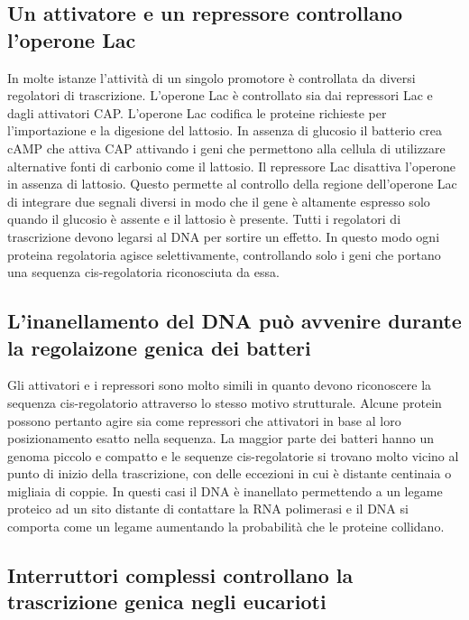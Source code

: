 \subsection{Un attivatore e un repressore controllano l'operone Lac}
In molte istanze l'attivit\`a di un singolo promotore \`e controllata da diversi regolatori di trascrizione. L'operone Lac \`e controllato sia dai repressori Lac e dagli attivatori CAP. 
L'operone Lac codifica le proteine richieste per l'importazione e la digesione del lattosio. In assenza di glucosio il batterio crea cAMP che attiva CAP attivando i geni che permettono
alla cellula di utilizzare alternative fonti di carbonio come il lattosio. Il repressore Lac disattiva l'operone in assenza di lattosio. Questo permette al controllo della regione 
dell'operone Lac di integrare due segnali diversi in modo che il gene \`e altamente espresso solo quando il glucosio \`e assente e il lattosio \`e presente. Tutti i regolatori di 
trascrizione devono legarsi al DNA per sortire un effetto. In questo modo ogni proteina regolatoria agisce selettivamente, controllando solo i geni che portano una sequenza 
cis-regolatoria riconosciuta da essa.
\subsection{L'inanellamento del DNA pu\`o avvenire durante la regolaizone genica dei batteri}
Gli attivatori e i repressori sono molto simili in quanto devono riconoscere la sequenza cis-regolatorio attraverso lo stesso motivo strutturale. Alcune protein possono pertanto agire
sia come repressori che attivatori in base al loro posizionamento esatto nella sequenza. La maggior parte dei batteri hanno un genoma piccolo e compatto e le sequenze cis-regolatorie si
trovano molto vicino al punto di inizio della trascrizione, con delle eccezioni in cui \`e distante centinaia o migliaia di coppie. In questi casi il DNA \`e inanellato permettendo a un
legame proteico ad un sito distante di contattare la RNA polimerasi e il DNA si comporta come un legame aumentando la probabilit\`a che le proteine collidano. 
\subsection{Interruttori complessi controllano la trascrizione genica negli eucarioti}
